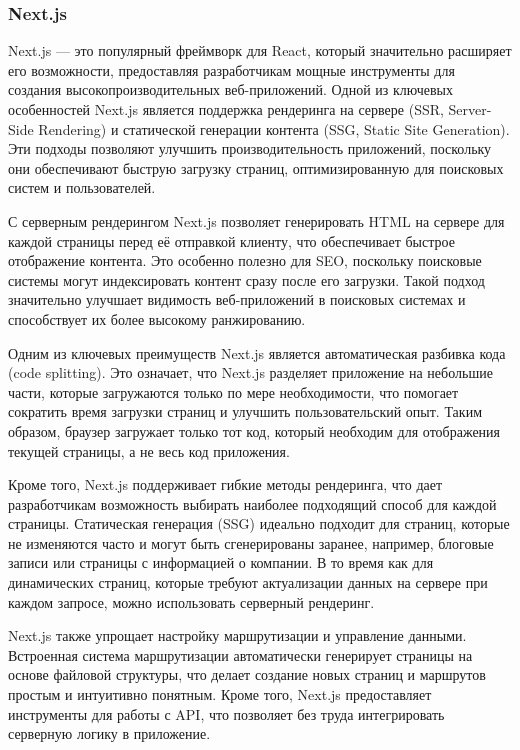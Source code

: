 \subsubsection*{Next.js}

Next.js — это популярный фреймворк для React, который значительно расширяет его возможности, предоставляя разработчикам мощные инструменты для создания высокопроизводительных веб-приложений. Одной из ключевых особенностей Next.js является поддержка рендеринга на сервере (SSR, Server-Side Rendering) и статической генерации контента (SSG, Static Site Generation). Эти подходы позволяют улучшить производительность приложений, поскольку они обеспечивают быструю загрузку страниц, оптимизированную для поисковых систем и пользователей.

С серверным рендерингом Next.js позволяет генерировать HTML на сервере для каждой страницы перед её отправкой клиенту, что обеспечивает быстрое отображение контента. Это особенно полезно для SEO, поскольку поисковые системы могут индексировать контент сразу после его загрузки. Такой подход значительно улучшает видимость веб-приложений в поисковых системах и способствует их более высокому ранжированию.

Одним из ключевых преимуществ Next.js является автоматическая разбивка кода (code splitting). Это означает, что Next.js разделяет приложение на небольшие части, которые загружаются только по мере необходимости, что помогает сократить время загрузки страниц и улучшить пользовательский опыт. Таким образом, браузер загружает только тот код, который необходим для отображения текущей страницы, а не весь код приложения.

Кроме того, Next.js поддерживает гибкие методы рендеринга, что дает разработчикам возможность выбирать наиболее подходящий способ для каждой страницы. Статическая генерация (SSG) идеально подходит для страниц, которые не изменяются часто и могут быть сгенерированы заранее, например, блоговые записи или страницы с информацией о компании. В то время как для динамических страниц, которые требуют актуализации данных на сервере при каждом запросе, можно использовать серверный рендеринг.

Next.js также упрощает настройку маршрутизации и управление данными. Встроенная система маршрутизации автоматически генерирует страницы на основе файловой структуры, что делает создание новых страниц и маршрутов простым и интуитивно понятным. Кроме того, Next.js предоставляет инструменты для работы с API, что позволяет без труда интегрировать серверную логику в приложение.

